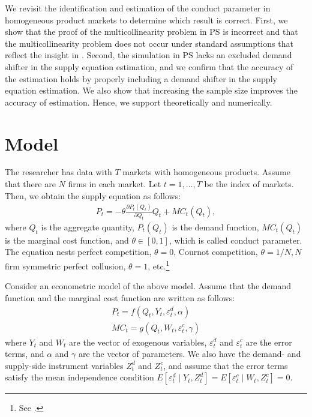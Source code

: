 \documentclass[11pt, a4paper]{article}
\begin{document}
We revisit the identification and estimation of the conduct parameter in homogeneous product markets to determine which result is correct.
First, we show that the proof of the multicollinearity problem in PS is incorrect and that the multicollinearity problem does not occur under standard assumptions that reflect the insight in \citet{bresnahan1982oligopoly}.
Second, the simulation in PS lacks an excluded demand shifter in the supply equation estimation, and we confirm that the accuracy of the estimation holds by properly including a demand shifter in the supply equation estimation. 
We also show that increasing the sample size improves the accuracy of estimation. 
Hence, we support \cite{bresnahan1982oligopoly} theoretically and numerically.

\section{Model}
The researcher has data with $T$ markets with homogeneous products.
Assume that there are $N$ firms in each market.
Let $t = 1,\ldots, T$ be the index of markets.
Then, we obtain the supply equation as follows:
\begin{align}
     P_t = -\theta\frac{\partial P_t(Q_{t})}{\partial Q_{t}}Q_{t} + MC_t(Q_{t}),\label{eq:supply_equation}
\end{align}
where $Q_{t}$ is the aggregate quantity, $P_t(Q_{t})$ is the demand function, $MC_{t}(Q_{t})$ is the marginal cost function, and $\theta\in[0,1]$, which is called conduct parameter. 
The equation nests perfect competition, $\theta=0$, Cournot competition, $\theta=1/N, N$ firm symmetric perfect collusion, $\theta=1$, etc.\footnote{See \cite{bresnahan1982oligopoly}.} 

Consider an econometric model of the above model.
Assume that the demand function and the marginal cost function are written as follows: 
\begin{align}
    P_t = f(Q_{t}, Y_t, \varepsilon^{d}_{t}, \alpha) \label{eq:demand}\\
    MC_t = g(Q_{t}, W_{t}, \varepsilon^{c}_{t}, \gamma)\label{eq:marginal_cost}
\end{align}
where $Y_t$ and $W_{t}$ are the vector of exogenous variables, $\varepsilon^{d}_{t}$ and $\varepsilon^{c}_{t}$ are the error terms, and $\alpha$ and $\gamma$ are the vector of parameters.
We also have the demand- and supply-side instrument variables $Z^{d}_{t}$ and $Z^{c}_{t}$, and assume that the error terms satisfy the mean independence condition $E[\varepsilon^{d}_{t}\mid Y_t, Z^{d}_{t}] = E[\varepsilon^{c}_{t} \mid W_{t}, Z^{c}_{t}] =0$.
\end{document}
